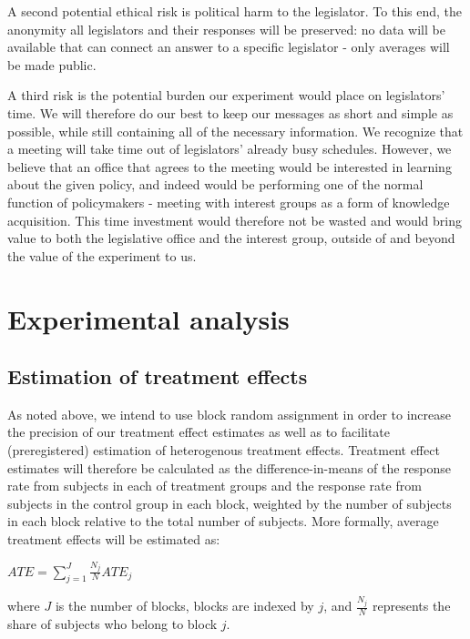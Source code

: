 \documentclass[12pt,final,fleqn]{article}
\theoremstyle{plain}
\begin{document}
A second potential ethical risk is political harm to the legislator. To this end, the anonymity all legislators and their responses will be preserved: no data will be available that can connect an answer to a specific legislator - only averages will be made public.

A third risk is the potential burden our experiment would place on legislators' time. We will therefore do our best to keep our messages as short and simple as possible, while still containing all of the necessary information. We recognize that a meeting will take time out of legislators' already busy schedules. However, we believe that an office that agrees to the meeting would be interested in learning about the given policy, and indeed would be  performing one of the normal function of policymakers - meeting with interest groups as a form of knowledge acquisition. This time investment would therefore not be wasted and would bring value to both the legislative office and the interest group, outside of and beyond the value of the experiment to us. 

\section{Experimental analysis} \label{sec:analysis}

\subsection{Estimation of treatment effects} \label{sec:treatment_effects}

As noted above, we intend to use block random assignment in order  to increase the precision of our treatment effect estimates as well as to facilitate (preregistered) estimation of heterogenous treatment effects. Treatment effect estimates will therefore be calculated as the difference-in-means of the response rate from subjects in each of treatment groups and the response rate from subjects in the control group in each block, weighted by the number of subjects in each block relative to the total number of subjects. More formally, average treatment effects will be estimated as:

\begin{center}
$ATE = \sum_{j = 1}^{J} \frac{N_j}{N}ATE_j$
\end{center}

\noindent
where $J$ is the number of blocks, blocks are indexed by $j$, and $\frac{N_j}{N}$ represents the share of subjects who belong to block $j$. 
\end{document}
